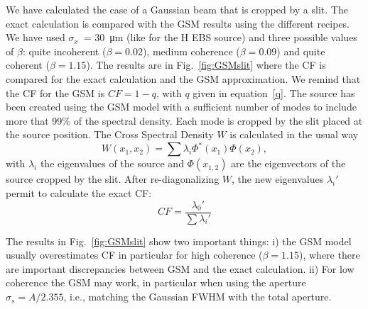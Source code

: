 \documentclass{iucr}              %
\begin{document}
We have calculated the case of a Gaussian beam that is cropped by a slit. The exact calculation is compared with the GSM results using the different recipes. We have used $\sigma_x$~= \SI{30}{\micro\meter} (like for the H EBS source) and three possible values of $\beta$: quite incoherent ($\beta=0.02$), medium coherence ($\beta=0.09$) and quite coherent ($\beta=1.15$). The results are in Fig.~\ref{fig:GSMslit} where the CF is compared for the exact calculation and the GSM approximation. We remind that the CF for the GSM is $CF = 1 - q$, with $q$ given in equation~\ref{q}.
The source has been created using the GSM model with a sufficient number of modes to include more that 99\% of the spectral density. Each mode is cropped by the slit placed at the source position. The Cross Spectral Density $W$ is calculated in the usual way 
\begin{equation}
    W(x_1,x_2) = \sum \lambda_i \Phi^*(x_1) \Phi(x_2),     
\end{equation}
with $\lambda_i$ the eigenvalues of the source and $\Phi(x_{1,2})$ are the eigenvectors of the source cropped by the slit. After re-diagonalizing $W$, the new eigenvalues $\lambda_i'$ permit to calculate the exact CF: 
\begin{equation}
    CF = \frac{\lambda_0'}{\sum \lambda_i'}
\end{equation}

The results in Fig.~\ref{fig:GSMslit} show two important things:
i) the GSM model usually overestimates CF in particular for high coherence ($\beta=1.15$), where there are important discrepancies between GSM and the exact calculation.
ii) For low coherence the GSM may work, in particular when using the aperture $\sigma_s=A/2.355$, i.e., matching the Gaussian FWHM with the total aperture.
\end{document}
